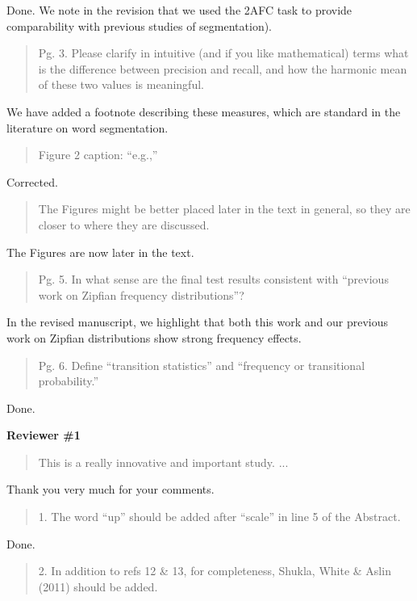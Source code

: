 \documentclass[12pt]{letter}
\begin{document}
Done. We note in the revision that we used the 2AFC task to provide comparability with previous studies of segmentation). 

\begin{quote}
Pg. 3. Please clarify in intuitive (and if you like mathematical) terms what is the difference between precision and recall, and how the harmonic mean of these two values is meaningful.
\end{quote}

We have added a footnote describing these measures, which are standard in the literature on word segmentation. 

\begin{quote}
Figure 2 caption: ``e.g.,''
\end{quote}

Corrected.

\begin{quote} 
The Figures might be better placed later in the text in general, so they are closer to where they are discussed.
\end{quote}

The Figures are now later in the text. 

\begin{quote}
Pg. 5. In what sense are the final test results consistent with ``previous work on Zipfian frequency distributions''?
\end{quote}

In the revised manuscript, we highlight that both this work and our previous work on Zipfian distributions show strong frequency effects.

\begin{quote}
Pg. 6. Define ``transition statistics'' and ``frequency or transitional probability.''
\end{quote}

Done.

{\bf Reviewer \#1}

\begin{quote}
This is a really innovative and important study. ...
\end{quote}

Thank you very much for your comments. 

\begin{quote}
1. The word ``up'' should be added after ``scale'' in line 5 of the Abstract.
\end{quote}

Done. 

\begin{quote}
2. In addition to refs 12 \& 13, for completeness, Shukla, White \& Aslin (2011) should be added.
\end{quote}
\end{document}
